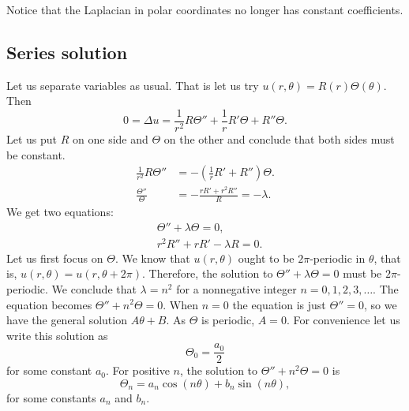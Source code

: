 \documentclass[12pt]{book}
\begin{document}
Notice that the Laplacian in polar coordinates no longer has constant
coefficients.

\subsection{Series solution}

Let us separate variables as usual.  That is let us try
$u(r,\theta) = R(r)\Theta(\theta)$.  Then
\begin{equation*}
0 = \Delta u = 
\frac{1}{r^2} R \Theta''
+
\frac{1}{r} R' \Theta
+
R'' \Theta .
\end{equation*}
Let us put $R$ on one side and $\Theta$ on the other and conclude
that both sides must be constant.
\begin{align*}
\frac{1}{r^2} R \Theta''
& =
-
\left(\frac{1}{r} R' + R''\right) \Theta .
\\
\frac{\Theta''}{\Theta}
& =
-
\frac{r R' + r^2 R''}{R} = -\lambda.
\end{align*}
We get two equations:
\begin{align*}
& \Theta'' + \lambda \Theta = 0 ,
\\
& r^2 R'' + r R' -\lambda R = 0.
\end{align*}
Let us first focus on $\Theta$.  We know that $u(r,\theta)$ ought to be
$2\pi$-periodic in $\theta$, that is,
$u(r,\theta) = u(r,\theta+2\pi)$.  Therefore, the solution to
$\Theta'' + \lambda \Theta = 0$ must be $2\pi$-periodic.  We conclude
that
$\lambda = n^2$ for a
nonnegative integer $n=0,1,2,3,\ldots$.  The equation becomes
$\Theta'' + n^2 \Theta = 0$.  When $n=0$ the equation is just
$\Theta'' = 0$, so we have the general solution $A \theta + B$.  As
$\Theta$ is periodic,
$A=0$.
For convenience let us write this solution as
\begin{equation*}
\Theta_0 = \frac{a_0}{2}
\end{equation*}
for some constant $a_0$.  For positive $n$,
the 
solution to
$\Theta'' + n^2 \Theta = 0$ is
\begin{equation*}
\Theta_n = a_n \cos(n\theta) + b_n \sin(n\theta) ,
\end{equation*}
for some constants $a_n$ and $b_n$.
\end{document}
